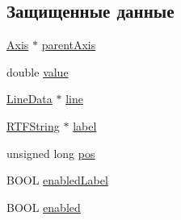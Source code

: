 \subsection*{Защищенные данные}
\begin{DoxyCompactItemize}
\item 
\hyperlink{class_axis}{Axis} $\ast$ \hyperlink{class_level_line_abcbf6e0a95632519d52b3c0828c926f4}{parent\-Axis}
\item 
double \hyperlink{class_level_line_ad006f9359dd288a3b189ab964bca9484}{value}
\item 
\hyperlink{class_line_data}{Line\-Data} $\ast$ \hyperlink{class_level_line_a98488406c76533a2e70d83197df2614b}{line}
\item 
\hyperlink{class_r_t_f_string}{R\-T\-F\-String} $\ast$ \hyperlink{class_level_line_a8900efadd241d325ed1333a4d4a930d6}{label}
\item 
unsigned long \hyperlink{class_level_line_ae4d3c142f618f987e6d7fc35e98e71d0}{pos}
\item 
B\-O\-O\-L \hyperlink{class_level_line_a76a0fa5a858439419e2cdd49faea7f64}{enabled\-Label}
\item 
B\-O\-O\-L \hyperlink{class_level_line_a887491a0111c8d710fdc491945f80ebb}{enabled}
\end{DoxyCompactItemize}


